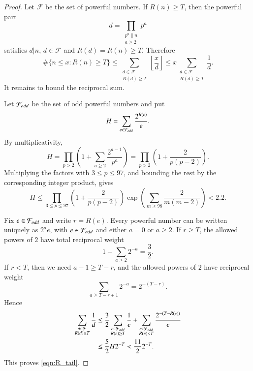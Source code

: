 \documentclass[12pt,a4paper,reqno]{amsart}
\theoremstyle{plain}
\numberwithin{sblmm}{thrm}
\numberwithin{equation}{section}
\begin{document}
\begin{proof}
    Let $\mathcal{F}$ be the set of powerful numbers. If $R(n)\ge T$, then the powerful part
    $$d=\prod_{\substack{p^a\lVert n\\ a\ge 2}}p^a$$
    satisfies $d|n$, $d\in\mathcal{F}$ and $R(d)=R(n)\ge T$. Therefore
    $$\#\{n\le x:R(n)\ge T\}\le\sum_{\substack{d\in\mathcal{F}\\ R(d)\ge T}}\left\lfloor\frac{x}{d}\right\rfloor\le x\sum_{\substack{d\in\mathcal{F}\\ R(d)\ge T}}\frac{1}{d}.$$
    It remains to bound the reciprocal sum.

    Let $\mathcal{F}_{\rm odd}$ be the set of odd powerful numbers and put
    $$H=\sum_{e\in\mathcal{F}_{\rm odd}}\frac{2^{R(e)}}{e}.$$
    By multiplicativity,
    $$H=\prod_{p>2}\left(1+\sum_{a\ge 2}\frac{2^{a-1}}{p^a}\right)=\prod_{p>2}\left(1+\frac{2}{p(p-2)}\right).$$
    Multiplying the factors with $3\le p\le 97$, and bounding the rest by the corresponding integer product, gives
    $$H\le\prod_{3\le p\le 97}\left(1+\frac{2}{p(p-2)}\right)\exp\left(\sum_{m\ge 98}\frac{2}{m(m-2)}\right)<2.2.$$

    Fix $e\in\mathcal{F}_{\rm odd}$ and write $r=R(e)$. Every powerful number can be written uniquely as $2^ae$, with $e\in\mathcal{F}_{\rm odd}$ and either $a=0$ or $a\ge 2$. If $r\ge T$, the allowed powers of $2$ have total reciprocal weight
    $$1+\sum_{a\ge 2}2^{-a}=\frac{3}{2}.$$
    If $r<T$, then we need $a-1\ge T-r$, and the allowed powers of $2$ have reciprocal weight
    $$\sum_{a\ge T-r+1}2^{-a}=2^{-(T-r)}.$$
    Hence
    \begin{align*}
        \sum_{\substack{d\in\mathcal{F}\\ R(d)\ge T}}\frac{1}{d}&\le\frac{3}{2}\sum_{\substack{e\in\mathcal{F}_{\rm odd}\\ R(e)\ge T}}\frac{1}{e}+\sum_{\substack{e\in\mathcal{F}_{\rm odd}\\ R(e)<T}}\frac{2^{-(T-R(e))}}{e}\\
        &\le\frac{5}{2}H2^{-T}<\frac{11}{2}2^{-T}.
    \end{align*}
    This proves \eqref{eqn:R_tail}.
\end{proof}
\end{document}
